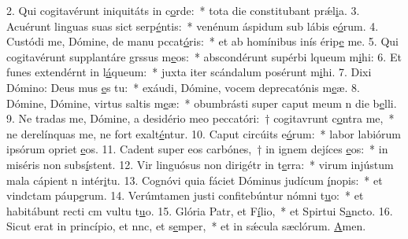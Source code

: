 2. Qui cogitavérunt iniquitáts in c\uline{o}rde:~* tota die constitubant prǽl\uline{i}a.
3. Acuérunt linguas suas sict serp\uline{é}ntis:~* venénum áspidum sub lábis e\uline{ó}rum.
4. Custódi me, Dómine, de manu pccat\uline{ó}ris:~* et ab homínibus inís érip\uline{e} me.
5. Qui cogitavérunt supplantáre grssus m\uline{e}os:~* abscondérunt supérbi lqueum m\uline{i}hi:
6. Et funes extendérnt in l\uline{á}queum:~* juxta iter scándalum posérunt m\uline{i}hi.
7. Dixi Dómino: Deus mus \uline{e}s tu:~* exáudi, Dómine, vocem deprecatónis m\uline{e}æ.
8. Dómine, Dómine, virtus saltis m\uline{e}æ:~* obumbrásti super caput meum n die b\uline{e}lli.
9. Ne tradas me, Dómine, a desidério meo peccatóri:~† cogitavrunt c\uline{o}ntra me,~* ne derelínquas me, ne fort exalt\uline{é}ntur.
10. Caput circúits e\uline{ó}rum:~* labor labiórum ipsórum opriet \uline{e}os.
11. Cadent super eos carbónes,~† in ignem dejíces \uline{e}os:~* in miséris non subs\uline{í}stent.
12. Vir linguósus non dirigétr in t\uline{e}rra:~* virum injústum mala cápient n intér\uline{i}tu.
13. Cognóvi quia fáciet Dóminus judícum \uline{í}nopis:~* et vindctam páup\uline{e}rum.
14. Verúmtamen justi confitebúntur nómni t\uline{u}o:~* et habitábunt recti cm vultu t\uline{u}o.
15. Glória Patr, et F\uline{í}lio,~* et Spirtui S\uline{a}ncto.
16. Sicut erat in princípio, et nnc, et s\uline{e}mper,~* et in sǽcula sæclórum. \uline{A}men.
